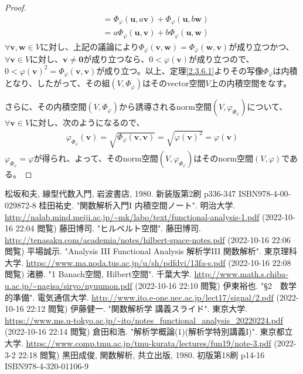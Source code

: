 \documentclass[dvipdfmx]{jsarticle}
\begin{document}
\begin{proof}
\begin{align*}
&= \varPhi_{\varphi}\left( \mathbf{u},a\mathbf{v} \right) + \varPhi_{\varphi}\left( \mathbf{u},b\mathbf{w} \right)\\
&= a\varPhi_{\varphi}\left( \mathbf{u},\mathbf{v} \right) + b\varPhi_{\varphi}\left( \mathbf{u},\mathbf{w} \right)
\end{align*}
$\forall\mathbf{v},\mathbf{w} \in V$に対し、上記の議論により$\varPhi_{\varphi}\left( \mathbf{v},\mathbf{w} \right) = \overline{\varPhi_{\varphi}\left( \mathbf{w},\mathbf{v} \right)}$が成り立つかつ、$\forall\mathbf{v} \in V$に対し、$\mathbf{v} \neq \mathbf{0}$が成り立つなら、$0 < \varphi\left( \mathbf{v} \right)$が成り立つので、$0 < {\varphi\left( \mathbf{v} \right)}^{2} = \varPhi_{\varphi}\left( \mathbf{v},\mathbf{v} \right)$が成り立つ。以上、定理\ref{2.3.6.1}よりその写像$\varPhi_{\varphi}$は内積となり、したがって、その組$\left( V,\varPhi_{\varphi} \right)$はそのvector空間$V$上の内積空間をなす。\par
さらに、その内積空間$\left( V,\varPhi_{\varphi} \right)$から誘導されるnorm空間$\left( V,\varphi_{\varPhi_{\varphi}} \right)$について、$\forall\mathbf{v} \in V$に対し、次のようになるので、
\begin{align*}
\varphi_{\varPhi_{\varphi}}\left( \mathbf{v} \right) = \sqrt{\varPhi_{\varphi}\left( \mathbf{v},\mathbf{v} \right)} = \sqrt{{\varphi\left( \mathbf{v} \right)}^{2}} = \varphi\left( \mathbf{v} \right)
\end{align*}
$\varphi_{\varPhi_{\varphi}} = \varphi$が得られ、よって、そのnorm空間$\left( V,\varphi_{\varPhi_{\varphi}} \right)$はそのnorm空間$(V,\varphi)$である。
\end{proof}
\begin{thebibliography}{50}
  松坂和夫, 線型代数入門, 岩波書店, 1980. 新装版第2刷 p336-347 ISBN978-4-00-029872-8
  桂田祐史. "関数解析入門I 内積空間ノート". 明治大学. \url{http://nalab.mind.meiji.ac.jp/~mk/labo/text/functional-analysis-1.pdf} (2022-10-16 22:04 閲覧)
  藤田博司. "ヒルベルト空間". 藤田博司. \url{http://tenasaku.com/academia/notes/hilbert-space-notes.pdf} (2022-10-16 22:06 閲覧)
  平場誠示. "Analysis III Functional Analysis 解析学III 関数解析". 東京理科大学. \url{https://www.ma.noda.tus.ac.jp/u/sh/pdfdvi/13fa-s.pdf} (2022-10-16 22:08 閲覧)
  渚勝. "1 Banach空間, Hilbert空間". 千葉大学. \url{http://www.math.s.chiba-u.ac.jp/~nagisa/siryo/nyuumon.pdf} (2022-10-16 22:10 閲覧)
  伊東裕也. "§2　数学的準備". 電気通信大学. \url{http://www.ito.e-one.uec.ac.jp/lect17/signal/2.pdf} (2022-10-16 22:12 閲覧)
  伊藤健一. "関数解析学 講義スライド". 東京大学. \url{https://www.ms.u-tokyo.ac.jp/~ito/notes_functional_analysis_20220224.pdf} (2022-10-16 22:14 閲覧)
  倉田和浩. "解析学概論(1)(解析学特別講義I)". 東京都立大学. \url{https://www.comp.tmu.ac.jp/tmu-kurata/lectures/fun19/note-3.pdf} (2022-3-2 22:18 閲覧)
  黒田成俊, 関数解析, 共立出版, 1980. 初版第18刷 p14-16 ISBN978-4-320-01106-9
\end{thebibliography}
\end{document}

